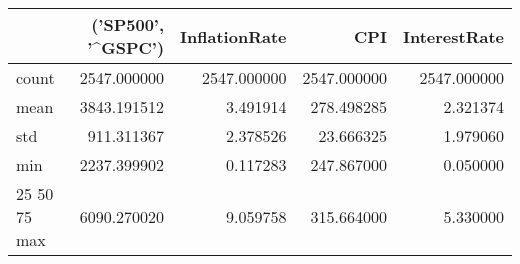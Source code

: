 \begin{tabular}{lrrrr}
\toprule
 & ('SP500', '^GSPC') & InflationRate & CPI & InterestRate \\
\midrule
count & 2547.000000 & 2547.000000 & 2547.000000 & 2547.000000 \\
mean & 3843.191512 & 3.491914 & 278.498285 & 2.321374 \\
std & 911.311367 & 2.378526 & 23.666325 & 1.979060 \\
min & 2237.399902 & 0.117283 & 247.867000 & 0.050000 \\
25%
50%
75%
max & 6090.270020 & 9.059758 & 315.664000 & 5.330000 \\
\bottomrule
\end{tabular}
